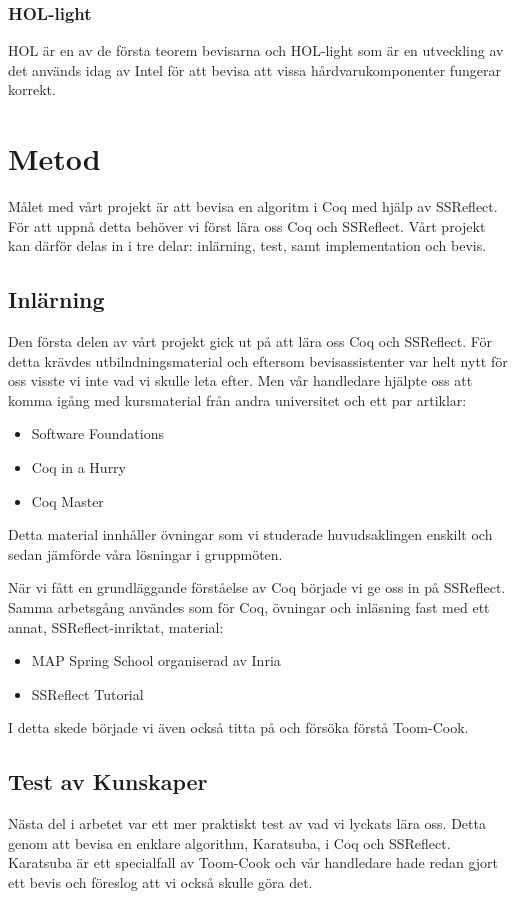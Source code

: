 \documentclass[a4paper]{article}
\begin{document}
\subsubsection{HOL-light}
HOL är en av de första teorem bevisarna och HOL-light som är en utveckling av
det används idag av Intel för att bevisa att vissa hårdvarukomponenter fungerar
korrekt.

\section{Metod}
Målet med vårt projekt är att bevisa en algoritm i Coq med hjälp av SSReflect.
För att uppnå detta behöver vi först lära oss Coq och SSReflect. Vårt projekt
kan därför delas in i tre delar: inlärning, test, samt implementation och
bevis.

\subsection{Inlärning}
Den första delen av vårt projekt gick ut på att lära oss Coq och SSReflect. För
detta krävdes utbilndningsmaterial och eftersom bevisassistenter var helt nytt
för oss visste vi inte vad vi skulle leta efter. Men vår handledare hjälpte oss
att komma igång med kursmaterial från andra universitet och ett par artiklar:
\begin{itemize}
  \item Software Foundations
  \item Coq in a Hurry
  \item Coq Master
\end{itemize}
Detta material innhåller övningar som vi studerade huvudsaklingen enskilt och
sedan jämförde våra lösningar i gruppmöten.

När vi fått en grundläggande förståelse av Coq började vi ge oss in på
SSReflect. Samma arbetsgång användes som för Coq, övningar och inläsning fast
med ett annat, SSReflect-inriktat, material:
\begin{itemize}
  \item MAP Spring School organiserad av Inria
  \item SSReflect Tutorial
\end{itemize}
I detta skede började vi även också titta på och försöka förstå Toom-Cook.

\subsection{Test av Kunskaper}
Nästa del i arbetet var ett mer praktiskt test av vad vi lyckats lära oss.
Detta genom att bevisa en enklare algorithm, Karatsuba, i Coq och SSReflect.
Karatsuba är ett specialfall av Toom-Cook och vår handledare hade redan gjort
ett bevis och föreslog att vi också skulle göra det.
\end{document}
